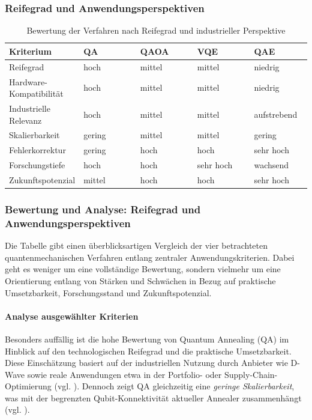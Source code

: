 \subsubsection*{Reifegrad und Anwendungsperspektiven}

\begin{table}[H]
\centering
\caption{Bewertung der Verfahren nach Reifegrad und industrieller Perspektive}
\renewcommand{\arraystretch}{1.2}
\begin{tabular}{|p{0.24\linewidth}|p{0.19\linewidth}|p{0.19\linewidth}|p{0.19\linewidth}|p{0.19\linewidth}|}
\hline
\textbf{Kriterium} & \textbf{QA} & \textbf{QAOA} & \textbf{VQE} & \textbf{QAE} \\
\hline
Reifegrad & hoch & mittel & mittel & niedrig \\
\hline
Hardware-Kompatibilität & hoch & mittel & mittel & niedrig \\
\hline
Industrielle Relevanz & hoch & mittel & mittel & aufstrebend \\
\hline
Skalierbarkeit & gering & mittel & mittel & gering \\
\hline
Fehlerkorrektur & gering & hoch & hoch & sehr hoch \\
\hline
Forschungstiefe & hoch & hoch & sehr hoch & wachsend \\
\hline
Zukunftspotenzial & mittel & hoch & hoch & sehr hoch \\
\hline
\end{tabular}
\end{table}


\subsubsection*{Bewertung und Analyse: Reifegrad und Anwendungsperspektiven}

Die Tabelle gibt einen überblicksartigen Vergleich der vier betrachteten quantenmechanischen Verfahren entlang zentraler Anwendungskriterien. Dabei geht es weniger um eine vollständige Bewertung, sondern vielmehr um eine Orientierung entlang von Stärken und Schwächen in Bezug auf praktische Umsetzbarkeit, Forschungsstand und Zukunftspotenzial.



\paragraph{Analyse ausgewählter Kriterien}

Besonders auffällig ist die hohe Bewertung von Quantum Annealing (QA) im Hinblick auf den technologischen Reifegrad und die praktische Umsetzbarkeit. Diese Einschätzung basiert auf der industriellen Nutzung durch Anbieter wie D-Wave sowie reale Anwendungen etwa in der Portfolio- oder Supply-Chain-Optimierung (vgl. \cite{mugel_dynamic_2022, sakuler_real-world_2025}). Dennoch zeigt QA gleichzeitig eine \emph{geringe Skalierbarkeit}, was mit der begrenzten Qubit-Konnektivität aktueller Annealer zusammenhängt (vgl. \cite{sakuler_real-world_2025}).

